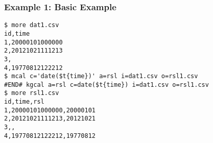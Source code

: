 \subsubsection*{Example 1: Basic Example}



\begin{Verbatim}[baselinestretch=0.7,frame=single]
$ more dat1.csv
id,time
1,20000101000000
2,20121021111213
3,
4,19770812122212
$ mcal c='date($t{time})' a=rsl i=dat1.csv o=rsl1.csv
#END# kgcal a=rsl c=date($t{time}) i=dat1.csv o=rsl1.csv
$ more rsl1.csv
id,time,rsl
1,20000101000000,20000101
2,20121021111213,20121021
3,,
4,19770812122212,19770812
\end{Verbatim}
